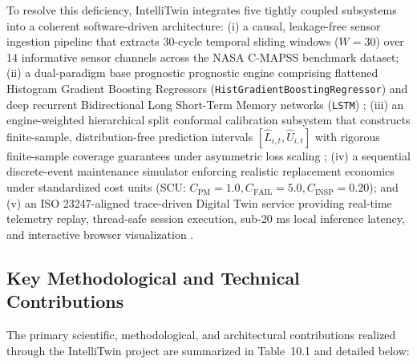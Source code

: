 \documentclass[12pt,a4paper]{article}
\begin{document}
To resolve this deficiency, IntelliTwin integrates five tightly coupled subsystems into a coherent software-driven architecture: (i) a causal, leakage-free sensor ingestion pipeline that extracts 30-cycle temporal sliding windows ($W=30$) over 14 informative sensor channels across the NASA C-MAPSS benchmark dataset; (ii) a dual-paradigm base prognostic prognostic engine comprising flattened Histogram Gradient Boosting Regressors (\texttt{HistGradientBoostingRegressor}) and deep recurrent Bidirectional Long Short-Term Memory networks (\texttt{LSTM}) \cite{huang2021bidirectional, diao2026ensemble}; (iii) an engine-weighted hierarchical split conformal calibration subsystem that constructs finite-sample, distribution-free prediction intervals $[\hat{L}_{i,t}, \hat{U}_{i,t}]$ with rigorous finite-sample coverage guarantees under asymmetric loss scaling \cite{javanmardi2023conformal, zhu2025regime}; (iv) a sequential discrete-event maintenance simulator enforcing realistic replacement economics under standardized cost units (SCU: $C_{\text{PM}}=1.0, C_{\text{FAIL}}=5.0, C_{\text{INSP}}=0.20$); and (v) an ISO 23247-aligned trace-driven Digital Twin service providing real-time telemetry replay, thread-safe session execution, sub-20 ms local inference latency, and interactive browser visualization \cite{chen2022digital, iso23247_1}.

\subsection{Key Methodological and Technical Contributions}
The primary scientific, methodological, and architectural contributions realized through the IntelliTwin project are summarized in Table~10.1 and detailed below:
\end{document}
